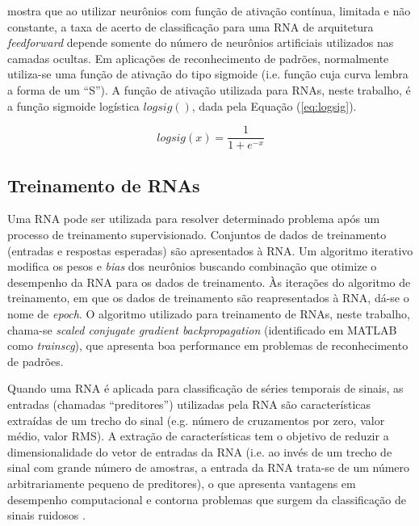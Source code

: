 

\cite{Hornik1991} mostra que ao utilizar neurônios com função de ativação contínua, limitada e não constante, a taxa de acerto de classificação para uma RNA de arquitetura \emph{feedforward} depende somente do número de neurônios artificiais utilizados nas camadas ocultas. Em aplicações de reconhecimento de padrões, normalmente utiliza-se uma função de ativação do tipo sigmoide (i.e. função cuja curva lembra a forma de um ``S'').  A função de ativação utilizada para RNAs, neste trabalho, é a função sigmoide logística $logsig()$, dada pela Equação (\ref{eq:logsig}).

\begin{equation}
\label{eq:logsig}
	logsig(x) = \frac{1}{1+e^{-x}}
\end{equation}

			\subsection{Treinamento de RNAs}

Uma RNA pode ser utilizada para resolver determinado problema após um processo de treinamento supervisionado. Conjuntos de dados de treinamento (entradas e respostas esperadas) são apresentados à RNA. Um algoritmo iterativo modifica os pesos e \emph{bias} dos neurônios buscando combinação que otimize o desempenho da RNA para os dados de treinamento. Às iterações do algoritmo de treinamento, em que os dados de treinamento são reapresentados à RNA, dá-se o nome de \emph{epoch}. O algoritmo utilizado para treinamento de RNAs, neste trabalho, chama-se \emph{scaled conjugate gradient backpropagation} \cite{Moller1993} (identificado em MATLAB como \emph{trainscg}), que apresenta boa performance em problemas de reconhecimento de padrões.

Quando uma RNA é aplicada para classificação de séries temporais de sinais, as entradas (chamadas ``preditores'') utilizadas pela RNA são características extraídas de um trecho do sinal (e.g. número de cruzamentos por zero, valor médio, valor RMS). A extração de características tem o objetivo de reduzir a dimensionalidade do vetor de entradas da RNA (i.e. ao invés de um trecho de sinal com grande número de amostras, a entrada da RNA trata-se de um número arbitrariamente pequeno de preditores), o que apresenta vantagens em desempenho computacional e contorna problemas que surgem da classificação de sinais ruidosos \cite{Kim2000}.

